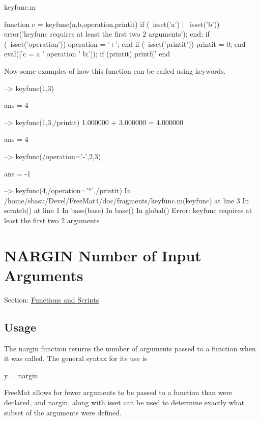 \begin{DoxyVerb}     keyfunc.m
\end{DoxyVerb}



\begin{DoxyVerbInclude}
function c = keyfunc(a,b,operation,printit)
  if (~isset('a') | ~isset('b'))
    error('keyfunc requires at least the first two 2 arguments');
  end;
  if (~isset('operation'))
    operation = '+';
  end
  if (~isset('printit'))
    printit = 0;
  end
  eval(['c = a ' operation ' b;']);
  if (printit)
    printf('%
  end
\end{DoxyVerbInclude}


Now some examples of how this function can be called using {\ttfamily keywords}.


\begin{DoxyVerbInclude}
--> keyfunc(1,3)                %

ans = 
 4 

--> keyfunc(1,3,/printit)       %
1.000000 + 3.000000 = 4.000000

ans = 
 4 

--> keyfunc(/operation='-',2,3) %

ans = 
 -1 

--> keyfunc(4,/operation='*',/printit) %
In /home/sbasu/Devel/FreeMat4/doc/fragments/keyfunc.m(keyfunc) at line 3
    In scratch() at line 1
    In base(base)
    In base()
    In global()
Error: keyfunc requires at least the first two 2 arguments
\end{DoxyVerbInclude}
 \hypertarget{functions_nargin}{}\section{N\-A\-R\-G\-I\-N Number of Input Arguments}\label{functions_nargin}
Section\-: \hyperlink{sec_functions}{Functions and Scripts} \hypertarget{vtkwidgets_vtkxyplotwidget_Usage}{}\subsection{Usage}\label{vtkwidgets_vtkxyplotwidget_Usage}
The {\ttfamily nargin} function returns the number of arguments passed to a function when it was called. The general syntax for its use is \begin{DoxyVerb}  y = nargin
\end{DoxyVerb}
 Free\-Mat allows for fewer arguments to be passed to a function than were declared, and {\ttfamily nargin}, along with {\ttfamily isset} can be used to determine exactly what subset of the arguments were defined.

